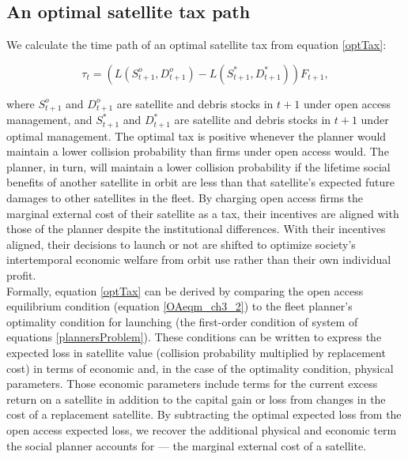 \documentclass[12pt]{article}
\begin{document}
\subsection{An optimal satellite tax path}

We calculate the time path of an optimal satellite tax from equation \ref{optTax}:

\begin{equation}
\label{optTax}
\tau_t = (L(S^o_{t+1},D^o_{t+1}) - L(S^*_{t+1},D^*_{t+1}))F_{t+1},
\end{equation}

where $S^o_{t+1}$ and $D^o_{t+1}$ are satellite and debris stocks in $t+1$ under open access management, and $S^*_{t+1}$ and $D^*_{t+1}$ are satellite and debris stocks in $t+1$ under optimal management. The optimal tax is positive whenever the planner would maintain a lower collision probability than firms under open access would. The planner, in turn, will maintain a lower collision probability if the lifetime social benefits of another satellite in orbit are less than that satellite's expected future damages to other satellites in the fleet. By charging open access firms the marginal external cost of their satellite as a tax, their incentives are aligned with those of the planner despite the institutional differences. With their incentives aligned, their decisions to launch or not are shifted to optimize society's intertemporal economic welfare from orbit use rather than their own individual profit. \\

Formally, equation \ref{optTax} can be derived by comparing the open access equilibrium condition (equation \ref{OAeqm_ch3_2}) to the fleet planner's optimality condition for launching (the first-order condition of system of equations \ref{plannersProblem}). These conditions can be written to express the expected loss in satellite value (collision probability multiplied by replacement cost) in terms of economic and, in the case of the optimality condition, physical parameters. Those economic parameters include terms for the current excess return on a satellite in addition to the capital gain or loss from changes in the cost of a replacement satellite. By subtracting the optimal expected loss from the open access expected loss, we recover the additional physical and economic term the social planner accounts for --- the marginal external cost of a satellite. 

\end{document}
